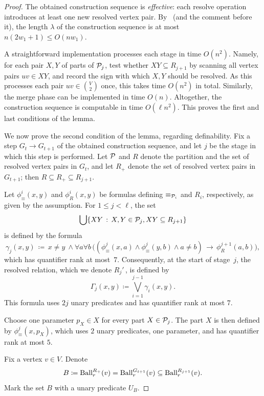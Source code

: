 \begin{proof}
The obtained construction sequence is \emph{effective}: each resolve operation introduces at least one new resolved vertex pair. By~\cite[Lemma~3.4]{mw-arxiv} (and the comment before it), the length $\lambda$ of the construction sequence is at most $n(2w_1+1) \leq O(nw_1)$.


A straightforward implementation processes each stage in time $O(n^2)$.
Namely, for each pair $X,Y$ of parts of $\mathcal P_j$,
test whether $XY\subseteq R_{j+1}$ by scanning 
all vertex pairs $uv\in XY$, and record the sign with which $X,Y$ should be resolved. As this processes each pair $uv\in \binom{V}{2}$ once, this takes time $O(n^2)$ in total. Similarly, the merge phase can be implemented in time $O(n)$.
Altogether, the  construction sequence is computable in time $O(\ell n^2)$.
This proves the first and last conditions of the lemma.

\medskip
    


We now prove the second condition of the lemma, regarding definability. 
Fix a step $G_t\to G_{t+1}$ of the obtained construction sequence, and let $j$ be the stage
in which this step is performed.
Let $\mathcal P$ and $R$ denote the partition and the set of resolved vertex pairs in $G_t$, and let $R_{+}$ denote the set of resolved vertex pairs in $G_{t+1}$; then $R\subseteq R_{+}\subseteq R_{j+1}$.



Let $\phi_\equiv^i(x,y)$ and $\phi_R^i(x,y)$ be formulas defining 
$\equiv_{\mathcal P_i}$ and $R_i$, respectively, as given by the assumption.
For $1\le j<\ell$, the set $$\bigcup\{XY \,:\, X,Y\in\mathcal P_j, XY\subseteq R_{j+1} \}$$ is defined 
by the formula
\[
 \gamma_j(x,y) \,\coloneqq\, x\ne y\ \land\forall a\forall b\,\bigl(
       (\phi_\equiv^{j}(x,a)\land\phi_\equiv^{j}(y,b)\land a\ne b)\,\to\,\phi_R^{j+1}(a,b)\bigr),
\]
which has quantifier rank at
most~$7$.  Consequently, at the start of stage~$j$, the resolved
relation, which we denote $R_j'$\,,
is defined by
\[
 \Gamma_{j}(x,y)\coloneqq \bigvee_{i=1}^{j-1}\gamma_i(x,y).
\]
This formula uses $2j$ unary predicates and has quantifier rank at most $7$.

Choose
one parameter $p_X\in X$ for every part $X\in \mathcal P_j$.
The part $X$ is then defined by $\phi_\equiv^{j}(x,p_X)$, which 
uses $2$ unary predicates, one parameter, and has quantifier rank at most $5$.


\medskip
Fix a vertex $v\in V$.
Denote
\[
 B\coloneqq \operatorname{Ball}^{R_{+}}_r(v)=\operatorname{Ball}^{G_{t+1}}_r(v)\subseteq\operatorname{Ball}^{R_{j+1}}_r(v).
\]
Mark the set $B$ with a unary predicate $U_B$.


\end{proof}
